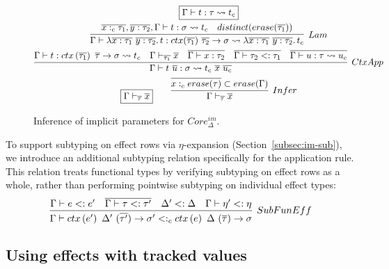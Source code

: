 \documentclass[acmsmall,review,screen]{acmart}
\newcommand{\mathframebox}[1]{\framebox{$\displaystyle #1$}}
\newcommand{\ap}{~}
\newcommand{\ctx}[1]{ctx\left(#1\right)~}
\newcommand{\step}{\rightsquigarrow}
\begin{document}
\begin{figure}
    \begin{gather*}
        \mathframebox{\Gamma\vdash t : \tau \step t_{c}} \\
        \infer[Lam]{
            \Gamma\vdash \lambda \overline{x : \tau_1} ~ \overline{y : \tau_2} \ldotp t : ctx(\overline{\tau_1}) ~ \overline{\tau_2} \to \sigma \step \lambda \overline{x : \tau_1} ~ \overline{y : \tau_2} \ldotp t_c
        }{
            \overline{x :_c \tau_1}, \overline{y : \tau_2}, \Gamma\vdash t : \sigma \step t_c &
            distinct(erase(\overline{\tau_1}))
        } \\
        \infer[CtxApp]{
            \Gamma\vdash t\ap\overline{u} : \sigma \step t_{c} \ap \overline{x}\ap\overline{u_{c}}
        }{
            \Gamma\vdash t : \ctx{\overline{\tau_1}} \overline{\tau} \to \sigma \step t_{c} &
            \Gamma\vdash_{\overline{\tau_1}}\overline{x} &
            \overline{\Gamma\vdash x : \tau_2} &
            \overline{\Gamma\vdash \tau_2 <: \tau_1} &
            \overline{\Gamma\vdash u : \tau \step u_{c}}
        } \\
        \mathframebox{\Gamma\vdash_{\overline{\tau}} \overline{x}}
        \text{\hspace{2em}}
        \infer[Infer]{\Gamma\vdash_{\overline{\tau}} \overline{x}}{\overline{x :_c erase(\tau)}\subset erase(\Gamma)}
    \end{gather*}
    \caption{Inference of implicit parameters for $Core_\Delta^{im}$.}
    \label{fig:core-im-delta-core-implicit-inference}
\end{figure}

To support subtyping on effect rows via $\eta$-expansion (Section~\ref{subsec:im-sub}), we introduce an additional subtyping relation specifically for the application rule.
This relation treats functional types by verifying subtyping on effect rows as a whole, rather than performing pointwise subtyping on individual effect types:
\[
    \infer[SubFunEff]{
        \Gamma\vdash \ctx{e'} \Delta' ~ (\overline{\tau'})\to \sigma' <:_c \ctx{e} \Delta ~ (\overline{\tau})\to \sigma
    }{
        \Gamma\vdash e <: e' & \overline{\Gamma\vdash \tau <: \tau'} & \Delta' <: \Delta & \Gamma\vdash \eta' <: \eta
    }
\]

\subsection{Using effects with tracked values} \label{subsec:relax-tracked}
\end{document}
